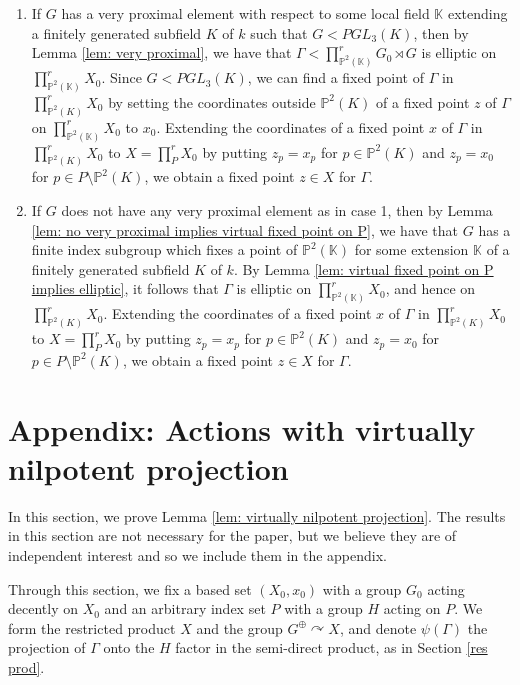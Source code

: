 \documentclass[12pt]{article}
\theoremstyle{definition}
\newcommand{\K}{\mathbb{K}}
\begin{document}
\begin{enumerate}
    \item If $G$ has a very proximal element with respect to some local field $\K$ extending a finitely generated subfield $K$ of $k$ such that $G < PGL_3(K)$, then by Lemma \ref{lem: very proximal}, we have that $\Gamma < \prod_{\mathbb{P}^2(\K)}^r G_0 \rtimes G$ is elliptic on $\prod_{\mathbb{P}^2(\K)}^r X_0$. Since $G < PGL_3(K)$, we can find a fixed point of $\Gamma$ in $\prod_{\mathbb{P}^2(K)}^r X_0$ by setting the coordinates outside $\mathbb{P}^2(K)$ of a fixed point $z$ of $\Gamma$ on $\prod_{\mathbb{P}^2(\K)}^r X_0$ to $x_0$. Extending the coordinates of a fixed point $x$ of $\Gamma$ in $\prod_{\mathbb{P}^2(K)}^r X_0$ to $X = \prod_P^{r} X_0$ by putting $z_p = x_p$ for $p \in \mathbb{P}^2(K)$ and $z_p = x_0$ for $p \in P \setminus \mathbb{P}^2(K)$, we obtain a fixed point $z \in X$ for $\Gamma$. 
    \item If $G$ does not have any very proximal element as in case 1, then by Lemma \ref{lem: no very proximal implies virtual fixed point on P}, we have that $G$ has a finite index subgroup which fixes a point of $\mathbb{P}^2(\K)$ for some extension $\K$ of a finitely generated subfield $K$ of $k$. By Lemma \ref{lem: virtual fixed point on P implies elliptic}, it follows that $\Gamma$ is elliptic on $\prod_{\mathbb{P}^2(\K)}^r X_0$, and hence on $\prod_{\mathbb{P}^2(K)}^r X_0$. Extending the coordinates of a fixed point $x$ of $\Gamma$ in $\prod_{\mathbb{P}^2(K)}^r X_0$ to $X = \prod_P^{r} X_0$ by putting $z_p = x_p$ for $p \in \mathbb{P}^2(K)$ and $z_p = x_0$ for $p \in P \setminus \mathbb{P}^2(K)$, we obtain a fixed point $z \in X$ for $\Gamma$. 
\end{enumerate}

\section{Appendix: Actions with virtually nilpotent projection}
\label{sec: virtually nilpotent case}

In this section, we prove Lemma \ref{lem: virtually nilpotent projection}. The results in this section are not necessary for the paper, but we believe they are of independent interest and so we include them in the appendix.  

Through this section, we fix a based set $(X_0, x_0)$ with a group $G_0$ acting decently on $X_0$ and an arbitrary index set $P$ with a group $H$ acting on $P$. We form the restricted product $X$ and the group $G^{\oplus} \curvearrowright X$, and denote $\psi(\Gamma)$ the projection of $\Gamma$ onto the $H$ factor in the semi-direct product, as in Section \ref{res prod}.
\end{document}
